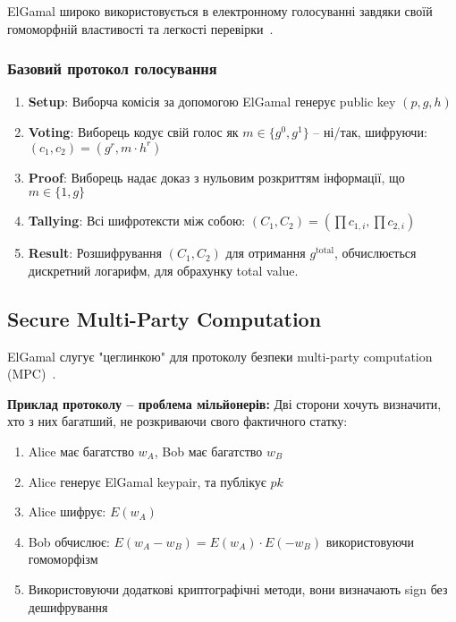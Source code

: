 ElGamal широко використовується в електронному голосуванні завдяки своїй гомоморфній властивості та легкості 
перевірки~\cite{cramer1997modular}.

\subsubsection{Базовий протокол голосування}

\begin{enumerate}
    \item \textbf{Setup}: Виборча комісія за допомогою ElGamal генерує public key $(p, g, h)$
    \item \textbf{Voting}: Виборець кодує свій голос як $m \in \{g^0, g^1\}$ -- ні/так, шифруючи: $(c_1, c_2) = (g^r, m \cdot h^r)$
    \item \textbf{Proof}: Виборець надає доказ з нульовим розкриттям інформації, що $m \in \{1, g\}$
    \item \textbf{Tallying}: Всі шифротексти між собою: $(C_1, C_2) = (\prod c_{1,i}, \prod c_{2,i})$
    \item \textbf{Result}: Розшифрування $(C_1, C_2)$ для отримання $g^{\text{total}}$, обчислюється дискретний 
            логарифм, для обрахунку total value.
\end{enumerate}

\subsection{Secure Multi-Party Computation}

ElGamal слугує "цеглинкою"{} для протоколу безпеки multi-party computation (MPC)~\cite{goldreich1998secure}.

\textbf{Приклад протоколу -- проблема мільйонерів:}
Дві сторони хочуть визначити, хто з них багатший, не розкриваючи свого фактичного статку:

\begin{enumerate}
    \item Alice має багатство $w_A$, Bob має багатство $w_B$
    \item Alice генерує ElGamal keypair, та публікує $pk$
    \item Alice шифрує: $E(w_A)$
    \item Bob обчислює: $E(w_A - w_B) = E(w_A) \cdot E(-w_B)$ використовуючи гомоморфізм
    \item Використовуючи додаткові криптографічні методи, вони визначають sign без дешифрування
\end{enumerate}

